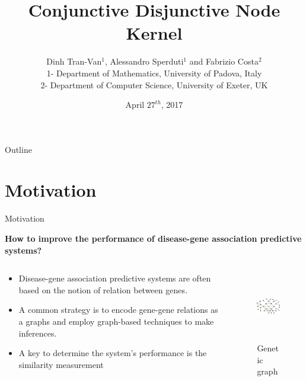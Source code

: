 \documentclass{beamer}
\title{Conjunctive Disjunctive Node Kernel}
\author{Dinh Tran-Van$^1$, Alessandro Sperduti$^1$ and Fabrizio Costa$^2$ \\\vspace{.8em}
1- Department of Mathematics, University of Padova, Italy \\
2- Department of Computer Science, University of Exeter, UK \vspace{3em}}
\date{April $27^{th}$, 2017}
\begin{document}
\maketitle

\begin{frame}{Outline}
	\tableofcontents
\end{frame}


\section{Motivation}
\begin{frame}[t]{Motivation}
\vspace{-.3cm}
\begin{block}{}
			\textbf{How to improve the performance of disease-gene association predictive systems?}
	\end{block}
\begin{columns}[T] %
\begin{column}{.65\textwidth}
	\begin{itemize}
		\item Disease-gene association predictive systems are often based on the notion of relation between genes. \vspace{.3em}
		\item A common strategy is to encode gene-gene relations as a graphs and employ graph-based techniques to make inferences. \vspace{.3em}
		\item A key to determine the system's performance is the similarity measurement
	\end{itemize}
\end{column}%
\begin{column}{.4\textwidth}
	\begin{figure}
	 \begin{flushright}%
	  \includegraphics[width=1.0\textwidth, height=3.0cm]{images/example.pdf}
	  \caption{Genetic graph}
	 \end{flushright}
	\end{figure}

\end{column}%
\end{columns}
\end{frame}
\end{document}
